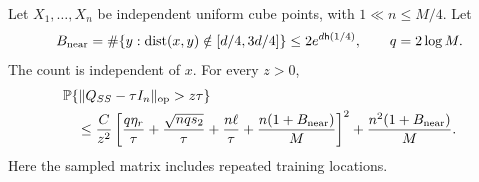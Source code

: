 \begin{lemma}\label{lem:gram-general}
Let $X_1,\ldots,X_n$ be independent uniform cube points, with
$1\ll n\le M/4$. Let
\[
 B_{\mathrm{near}}=\#\{y:\operatorname{dist}(x,y)\notin[d/4,3d/4]\}
 \le 2e^{d\mathsf h(1/4)},\qquad q=2\log M.
\]
The count is independent of $x$. For every $z>0$,
\begin{align}
 &\mathbb P\{\|Q_{SS}-\tau I_n\|_{\mathrm{op}}>z\tau\}
 \notag\\
 &\quad\le\frac C{z^2}
 \left[\frac{q\eta_r}{\tau}
       +\frac{\sqrt{nq s_2}}{\tau}
       +\frac{n\ell}{\tau}
       +\frac{n(1+B_{\mathrm{near}})}M\right]^2
       +\frac{n^2(1+B_{\mathrm{near}})}M.
 \label{eq:gram-bound}
\end{align}
Here the sampled matrix includes repeated training locations.
\end{lemma}
